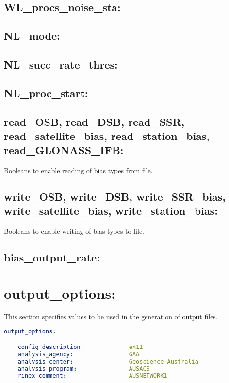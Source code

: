\subsection*{WL\_procs\_noise\_sta:}

\subsection*{NL\_mode:}

\subsection*{NL\_succ\_rate\_thres:}

\subsection*{NL\_proc\_start:}

\subsection*{read\_OSB, read\_DSB, read\_SSR, read\_satellite\_bias, read\_station\_bias, read\_GLONASS\_IFB:}

Booleans to enable reading of bias types from file.

\subsection*{write\_OSB, write\_DSB, write\_SSR\_bias, write\_satellite\_bias, write\_station\_bias:}

Booleans to enable writing of bias types to file.

\subsection*{bias\_output\_rate:}










\section{output\_options:}

This section specifies values to be used in the generation of output files.

\begin{lstlisting}[language=yaml,caption=output\_options:]
output_options:

    config_description:             ex11
    analysis_agency:                GAA
    analysis_center:                Geoscience Australia
    analysis_program:               AUSACS
    rinex_comment:                  AUSNETWORK1
\end{lstlisting}

